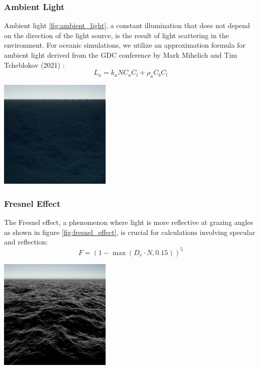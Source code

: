 \subsubsection{Ambient Light}
Ambient light \ref{fig:ambient_light}, a constant illumination that does not depend on the direction of the light source, is the result of light scattering in the environment. For oceanic simulations, we utilize an approximation formula for ambient light derived from the GDC conference by Mark Mihelich and Tim Tcheblokov (2021) \cite{mark2021}: 
\begin{equation}
    L_a = k_a N C_a C_l + \rho_a C_b C_l
\end{equation}
\begin{minipage}{1\textwidth}
    \centering
    \includegraphics[width=0.40\textwidth]{"images/ambient_light.png"}
    \label{fig:ambient_light}
\end{minipage}

\subsubsection{Fresnel Effect}
The Fresnel effect, a phenomenon where light is more reflective at grazing angles as shown in figure \ref{fig:fresnel_effect}, is crucial for calculations involving specular and reflection:
\begin{equation}
    F = (1 - \max(D_v \cdot N, 0.15))^{5}
\end{equation}
\begin{minipage}{1\textwidth}
    \centering
    \includegraphics[width=0.40\textwidth]{"images/fresnel.png"}
    \label{fig:fresnel_effect}
\end{minipage}

